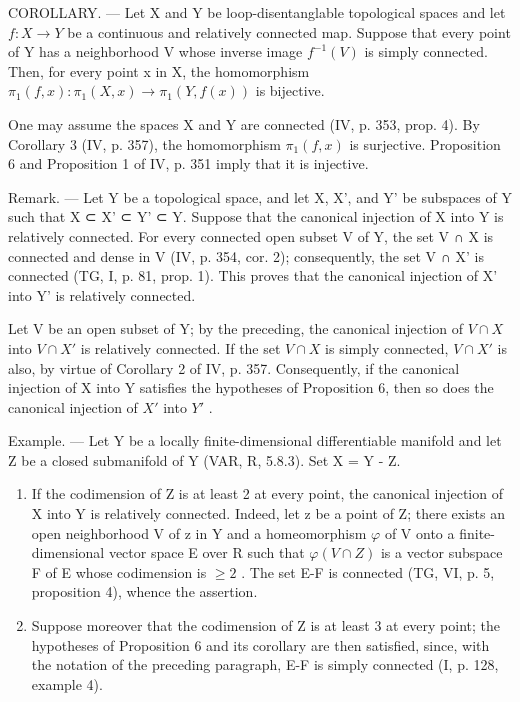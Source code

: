 COROLLARY. --- Let X and Y be loop-disentanglable topological spaces and let \(f: X \to Y\) be a continuous and relatively connected map. Suppose that every point of Y has a neighborhood V whose inverse image \(f^{-1}(V)\) is simply connected. Then, for every point x in X, the homomorphism \(\pi_{1}(f,x): \pi_{1}(X,x) \to \pi_{1}(Y,f(x))\) is bijective.

One may assume the spaces X and Y are connected (IV, p. 353, prop. 4). By Corollary 3 (IV, p. 357), the homomorphism \(\pi_1(f,x)\) is surjective. Proposition 6 and Proposition 1 of IV, p. 351 imply that it is injective.

Remark. --- Let Y be a topological space, and let X, X', and Y' be subspaces of Y such that X ⊂ X' ⊂ Y' ⊂ Y. Suppose that the canonical injection of X into Y is relatively connected. For every connected open subset V of Y, the set V ∩ X is connected and dense in V (IV, p. 354, cor. 2); consequently, the set V ∩ X' is connected (TG, I, p. 81, prop. 1). This proves that the canonical injection of X' into Y' is relatively connected.

Let V be an open subset of Y; by the preceding, the canonical injection of \(V \cap X\) into \(V \cap X'\) is relatively connected. If the set \(V \cap X\) is simply connected, \(V \cap X'\) is also, by virtue of Corollary 2 of IV, p. 357. Consequently, if the canonical injection of X into Y satisfies the hypotheses of Proposition 6, then so does the canonical injection of \(X'\) into \(Y'\) .

Example. --- Let Y be a locally finite-dimensional differentiable manifold and let Z be a closed submanifold of Y (VAR, R, 5.8.3). Set X = Y - Z.

\begin{enumerate}
\def\labelenumi{\alph{enumi})}
\item
  If the codimension of Z is at least 2 at every point, the canonical injection of X into Y is relatively connected. Indeed, let z be a point of Z; there exists an open neighborhood V of z in Y and a homeomorphism \(\varphi\) of V onto a finite-dimensional vector space E over R such that \(\varphi(V \cap Z)\) is a vector subspace F of E whose codimension is \(\geqslant 2\) . The set E-F is connected (TG, VI, p. 5, proposition 4), whence the assertion.
\item
  Suppose moreover that the codimension of Z is at least 3 at every point; the hypotheses of Proposition 6 and its corollary are then satisfied, since, with the notation of the preceding paragraph, E-F is simply connected (I, p. 128, example 4).
\end{enumerate}

